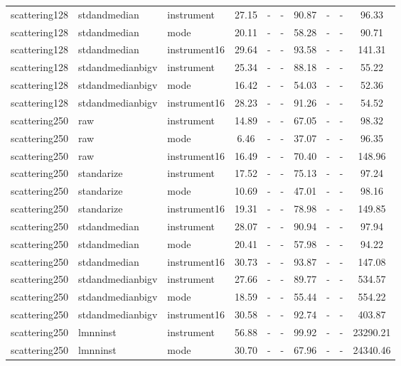 \begin{tabular}{lllccccccc}
scattering128 & stdandmedian & instrument & 27.15 &   - &   - & 90.87 &   - &   - &     96.33 \\ 
scattering128 & stdandmedian & mode & 20.11 &   - &   - & 58.28 &   - &   - &     90.71 \\ 
scattering128 & stdandmedian & instrument16 & 29.64 &   - &   - & 93.58 &   - &   - &    141.31 \\ 
scattering128 & stdandmedianbigv & instrument & 25.34 &   - &   - & 88.18 &   - &   - &     55.22 \\ 
scattering128 & stdandmedianbigv & mode & 16.42 &   - &   - & 54.03 &   - &   - &     52.36 \\ 
scattering128 & stdandmedianbigv & instrument16 & 28.23 &   - &   - & 91.26 &   - &   - &     54.52 \\ 
scattering250 & raw & instrument & 14.89 &   - &   - & 67.05 &   - &   - &     98.32 \\ 
scattering250 & raw & mode &  6.46 &   - &   - & 37.07 &   - &   - &     96.35 \\ 
scattering250 & raw & instrument16 & 16.49 &   - &   - & 70.40 &   - &   - &    148.96 \\ 
scattering250 & standarize & instrument & 17.52 &   - &   - & 75.13 &   - &   - &     97.24 \\ 
scattering250 & standarize & mode & 10.69 &   - &   - & 47.01 &   - &   - &     98.16 \\ 
scattering250 & standarize & instrument16 & 19.31 &   - &   - & 78.98 &   - &   - &    149.85 \\ 
scattering250 & stdandmedian & instrument & 28.07 &   - &   - & 90.94 &   - &   - &     97.94 \\ 
scattering250 & stdandmedian & mode & 20.41 &   - &   - & 57.98 &   - &   - &     94.22 \\ 
scattering250 & stdandmedian & instrument16 & 30.73 &   - &   - & 93.87 &   - &   - &    147.08 \\ 
scattering250 & stdandmedianbigv & instrument & 27.66 &   - &   - & 89.77 &   - &   - &    534.57 \\ 
scattering250 & stdandmedianbigv & mode & 18.59 &   - &   - & 55.44 &   - &   - &    554.22 \\ 
scattering250 & stdandmedianbigv & instrument16 & 30.58 &   - &   - & 92.74 &   - &   - &    403.87 \\ 
scattering250 & lmnninst & instrument & 56.88 &   - &   - & 99.92 &   - &   - &  23290.21 \\ 
scattering250 & lmnninst & mode & 30.70 &   - &   - & 67.96 &   - &   - &  24340.46 \\ 

\end{tabular}
